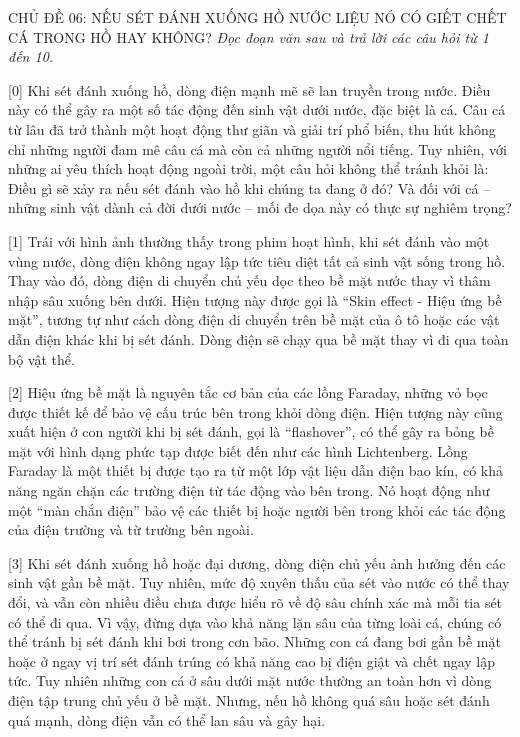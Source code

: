 \documentclass[12pt,a4paper,twoside]{article}
\newenvironment{readingpassage}[1][]{%
    \begin{tcolorbox}[enhanced, colback=grayLight, colframe=secondaryBlue,
        coltitle=textDark, fonttitle=\bfseries, title={#1},
        rounded corners, arc=3mm, boxrule=1pt,
        left=15pt, right=15pt, top=10pt, bottom=10pt,
        breakable, before skip=10pt, after skip=10pt, drop fuzzy shadow]
    \setstretch{1.3}
}{\end{tcolorbox}}
\begin{document}
\newpage
\label{a_cd06}
\begin{topicbox}{\large CHỦ ĐỀ 06: NẾU SÉT ĐÁNH XUỐNG HỒ NƯỚC LIỆU NÓ CÓ GIẾT CHẾT CÁ TRONG HỒ HAY KHÔNG?}
\vspace{8pt}
\textit{Đọc đoạn văn sau và trả lời các câu hỏi từ 1 đến 10.}
\vspace{6pt}
\end{topicbox}
\vspace{5pt}
\begin{readingpassage}[]
[0] Khi sét đánh xuống hồ, dòng điện mạnh mẽ sẽ lan truyền trong nước. Điều này có thể gây ra một số tác động đến sinh vật dưới nước, đặc biệt là cá. Câu cá từ lâu đã trở thành một hoạt động thư giãn và giải trí phổ biến, thu hút không chỉ những người đam mê câu cá mà còn cả những người nổi tiếng. Tuy nhiên, với những ai yêu thích hoạt động ngoài trời, một câu hỏi không thể tránh khỏi là: Điều gì sẽ xảy ra nếu sét đánh vào hồ khi chúng ta đang ở đó? Và đối với cá -- những sinh vật dành cả đời dưới nước -- mối đe dọa này có thực sự nghiêm trọng?

[1] Trái với hình ảnh thường thấy trong phim hoạt hình, khi sét đánh vào một vùng nước, dòng điện không ngay lập tức tiêu diệt tất cả sinh vật sống trong hồ. Thay vào đó, dòng điện di chuyển chủ yếu dọc theo bề mặt nước thay vì thâm nhập sâu xuống bên dưới. Hiện tượng này được gọi là ``Skin effect - Hiệu ứng bề mặt'', tương tự như cách dòng điện di chuyển trên bề mặt của ô tô hoặc các vật dẫn điện khác khi bị sét đánh. Dòng điện sẽ chạy qua bề mặt thay vì đi qua toàn bộ vật thể.

[2] Hiệu ứng bề mặt là nguyên tắc cơ bản của các lồng Faraday, những vỏ bọc được thiết kế để bảo vệ cấu trúc bên trong khỏi dòng điện. Hiện tượng này cũng xuất hiện ở con người khi bị sét đánh, gọi là ``flashover'', có thể gây ra bỏng bề mặt với hình dạng phức tạp được biết đến như các hình Lichtenberg. Lồng Faraday là một thiết bị được tạo ra từ một lớp vật liệu dẫn điện bao kín, có khả năng ngăn chặn các trường điện từ tác động vào bên trong. Nó hoạt động như một ``màn chắn điện'' bảo vệ các thiết bị hoặc người bên trong khỏi các tác động của điện trường và từ trường bên ngoài.

[3] Khi sét đánh xuống hồ hoặc đại dương, dòng điện chủ yếu ảnh hưởng đến các sinh vật gần bề mặt. Tuy nhiên, mức độ xuyên thấu của sét vào nước có thể thay đổi, và vẫn còn nhiều điều chưa được hiểu rõ về độ sâu chính xác mà mỗi tia sét có thể đi qua. Vì vậy, đừng dựa vào khả năng lặn sâu của từng loài cá, chúng có thể tránh bị sét đánh khi bơi trong cơn bão. Những con cá đang bơi gần bề mặt hoặc ở ngay vị trí sét đánh trúng có khả năng cao bị điện giật và chết ngay lập tức. Tuy nhiên những con cá ở sâu dưới mặt nước thường an toàn hơn vì dòng điện tập trung chủ yếu ở bề mặt. Nhưng, nếu hồ không quá sâu hoặc sét đánh quá mạnh, dòng điện vẫn có thể lan sâu và gây hại.


\end{readingpassage}
\end{document}
